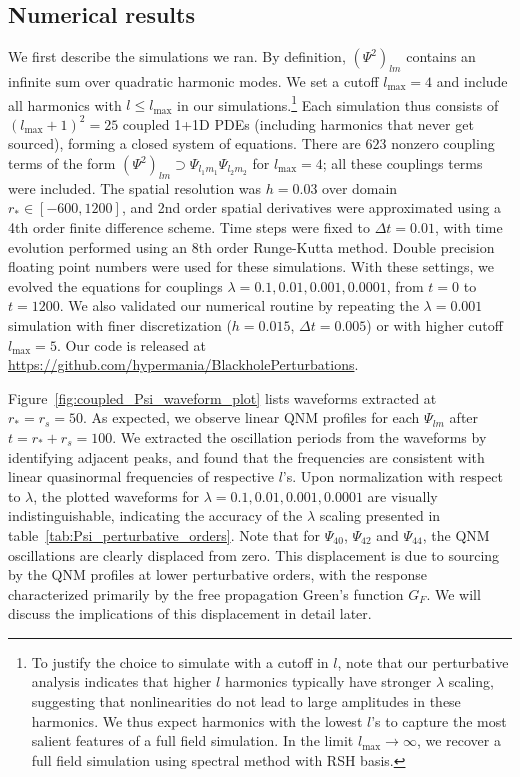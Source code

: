 \documentclass[reprint,aps,physrev,superscriptaddress,10pt,notitlepage,prd,nofootinbib,onecolumn]{revtex4-2}
\newcommand{\Fref}[1]{Figure~\ref{#1}}
\newcommand{\tref}[1]{table~\ref{#1}}
\newcommand{\Revise}[1]{{\color{red} #1}}
\begin{document}
\subsection{Numerical results}
\label{sec:coupled_simulation_numerical}
We first describe the simulations we ran.
By definition, $(\Psi^2)_{lm}$ contains an infinite sum over quadratic harmonic modes.
We set a cutoff $l_{\mathrm{max}} = 4$ and include all harmonics with $l \leq l_{\mathrm{max}}$ in our simulations.\footnote{To justify the choice to simulate with a cutoff in $l$, note that our perturbative analysis indicates that higher $l$ harmonics typically have stronger $\lambda$ scaling, suggesting that nonlinearities do not lead to large amplitudes in these harmonics. We thus expect harmonics with the lowest $l$'s to capture the most salient features of a full field simulation. In the limit $l_{\mathrm{max}} \to \infty$, we recover a full field simulation using spectral method with RSH basis.}
Each simulation thus consists of $(l_{\mathrm{max}}+1)^2 = 25$ coupled 1+1D PDEs (including harmonics that never get sourced), forming a closed system of equations.
There are $623$ nonzero coupling terms of the form $(\Psi^2)_{lm} \supset \Psi_{l_1 m_1} \Psi_{l_2 m_2}$ for $l_{\mathrm{max}}=4$; all these couplings terms were included.
The spatial resolution was $h = 0.03$ over domain $r_* \in [-600,1200]$, and 2nd order spatial derivatives were approximated using a 4th order finite difference scheme.
Time steps were fixed to $\Delta{t} = 0.01$, with time evolution performed using an 8th order Runge-Kutta method.
Double precision floating point numbers were used for these simulations.
With these settings, we evolved the equations for couplings $\lambda = 0.1, 0.01, 0.001, 0.0001$, from $t=0$ to $t=1200$.
\Revise{We also validated our numerical routine by repeating the $\lambda = 0.001$ simulation with finer discretization ($h=0.015$, $\Delta{t} = 0.005$) or with higher cutoff $l_{\mathrm{max}} = 5$.}
Our code is released at \url{https://github.com/hypermania/BlackholePerturbations}.


\Fref{fig:coupled_Psi_waveform_plot} lists waveforms extracted at $r_*=r_s=50$.
As expected, we observe linear QNM profiles for each $\Psi_{lm}$ after $t = r_* + r_s = 100$.
We extracted the oscillation periods from the waveforms by identifying adjacent peaks, and found that the frequencies are consistent with linear quasinormal frequencies of respective $l$'s.
Upon normalization with respect to $\lambda$, the plotted waveforms for $\lambda=0.1, 0.01, 0.001, 0.0001$ are visually indistinguishable, indicating the accuracy of the $\lambda$ scaling presented in \tref{tab:Psi_perturbative_orders}.
Note that for $\Psi_{40}$, $\Psi_{42}$ and $\Psi_{44}$, the QNM oscillations are clearly displaced from zero.
This displacement is due to sourcing by the QNM profiles at lower perturbative orders, with the response characterized primarily by the free propagation Green's function $G_F$.
We will discuss the implications of this displacement in detail later.
\end{document}
